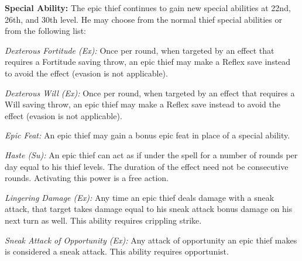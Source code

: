 \textbf{Special Ability:} The epic thief continues to gain new special abilities at 22nd, 26th, and 30th level. He may choose from the normal thief special abilities or from the following list:

\textit{Dexterous Fortitude (Ex):} Once per round, when targeted by an effect that requires a Fortitude saving throw, an epic thief may make a Reflex save instead to avoid the effect (evasion is not applicable).

\textit{Dexterous Will (Ex):} Once per round, when targeted by an effect that requires a Will saving throw, an epic thief may make a Reflex save instead to avoid the effect (evasion is not applicable).

\textit{Epic Feat:} An epic thief may gain a bonus epic feat in place of a special ability.

\textit{Haste (Su):} An epic thief can act as if under the  spell for a number of rounds per day equal to \onefifth his thief levels. The duration of the effect need not be consecutive rounds. Activating this power is a free action.

\textit{Lingering Damage (Ex):} Any time an epic thief deals damage with a sneak attack, that target takes damage equal to his sneak attack bonus damage on his next turn as well. This ability requires crippling strike.

\textit{Sneak Attack of Opportunity (Ex):} Any attack of opportunity an epic thief makes is considered a sneak attack. This ability requires opportunist.


